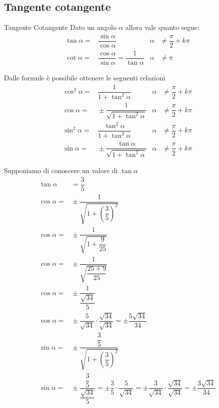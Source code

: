 \subsection{Tangente cotangente}
\label{sec:TangenteCotangente}
\begin{definizionet}{Tangente Cotangente}{}
	Dato un angolo $\alpha$ allora vale quanto segue:
\begin{align}
\tan\alpha=&{}\dfrac{\sin\alpha}{\cos\alpha}&\alpha&{}\neq\dfrac{\pi}{2}+k\pi\label{equ:tangente1}\\
\cot\alpha=&{}\dfrac{\cos\alpha}{\sin\alpha}={}\dfrac{1}{\tan\alpha}& \alpha&{}\neq\pi\label{equ:cotangente1}
\end{align}
\end{definizionet}
Dalle formule\nobs{} è possibile ottenere le seguenti relazioni
\begin{align*}
\cos^{2}\alpha=&{}\dfrac{1}{1+{\tan}^{2}\alpha} &\alpha&{}\neq\dfrac{\pi}{2}+k\pi\\
\cos\alpha=&{}\pm\dfrac{1}{\sqrt{1+{\tan}^{2}\alpha}} &\alpha{}&\neq\dfrac{\pi}{2}+k\pi\\
\sin^{2}\alpha=&{}\dfrac{\tan^{2}\alpha}{1+\tan^{2}\alpha}&\alpha{}&\neq\dfrac{\pi}{2}+k\pi\\
\sin\alpha=&{}\pm\dfrac{\tan\alpha}{\sqrt{1+\tan^{2}\alpha}}&\alpha{}&\neq\dfrac{\pi}{2}+k\pi
\end{align*}
\begin{esempiot}{}{}
Supponiamo di conoscere un valore di $\tan\alpha$
\begin{align*}
\tan\alpha&{}=\dfrac{3}{5}\\
\cos\alpha=&{}\pm\dfrac{1}{\sqrt{1+\left(\dfrac{3}{5}\right)^2}}\\
\cos\alpha=&{}\pm\dfrac{1}{\sqrt{1+\dfrac{9}{25}}}\\
\cos\alpha=&{}\pm\dfrac{1}{\sqrt{\dfrac{25+9}{25}}}\\
\cos\alpha=&{}\pm\dfrac{1}{\dfrac{\sqrt{34}}{5}}\\
\cos\alpha=&{}\pm\dfrac{5}{\sqrt{34}}\cdot\dfrac{\sqrt{34}}{\sqrt{34}}=\pm\dfrac{5\sqrt{34}}{34}\\
\sin\alpha=&{}\pm\dfrac{\dfrac{3}{5}}{\sqrt{1+\left(\dfrac{3}{5}\right)^2}}\\
\sin\alpha=&{}\pm\dfrac{\dfrac{3}{5}}{\dfrac{\sqrt{34}}{5}}=\pm\dfrac{3}{5}\cdot\dfrac{5}{\sqrt{34}}=\pm\dfrac{3}{\sqrt{34}}\cdot\dfrac{\sqrt{34}}{\sqrt{34}}=\pm\dfrac{3\sqrt{34}}{34}
\end{align*}
\end{esempiot}
